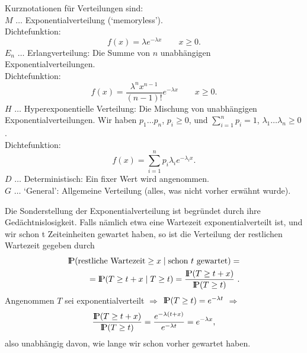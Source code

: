 Kurznotationen für Verteilungen sind: \\
$M$ $\dots$ Exponentialverteilung (`memoryless'). \\
Dichtefunktion:
\begin{displaymath}
f(x) = \lambda e^{-\lambda x} \qquad x\geq 0.
\end{displaymath}
$E_{n}$ $\dots$ Erlangverteilung: Die Summe von $n$ unabhängigen
Exponentialverteilungen.\\
 Dichtefunktion:
\begin{displaymath}
f(x)=\frac{\lambda^{n}x^{n-1}}{(n-1)!}e^{-\lambda x} \qquad x\geq 0.
\end{displaymath}
$H$ $\dots$ Hyperexponentielle Verteilung: Die Mischung von unabhängigen
Exponentialverteilungen. Wir haben $p_{1} \dots p_{n}$,  $p_{i} \geq 0$,
 und
$\sum_{i=1}^{n} p_{i} = 1$, $\lambda_{1} \dots \lambda_{n} \geq 0$. \\
Dichtefunktion:
\begin{displaymath}
f(x)=\sum_{i=1}^{n} p_{i} \lambda_{i} e^{-\lambda_{i}x}.
\end{displaymath}
$D$ $\dots$ Deterministisch: Ein fixer Wert wird angenommen. \\
$G$ $\dots$ `General': Allgemeine Verteilung (alles, was nicht vorher erwähnt
wurde).

Die Sonderstellung der Exponentialverteilung ist begründet durch ihre
Gedächtnislosigkeit. Falls nämlich etwa eine Wartezeit
exponentialverteilt ist, und wir schon t Zeiteinheiten gewartet haben, so
ist die Verteilung der restlichen Wartezeit gegeben durch
\begin{eqnarray*}
{\rm I\kern-0.2em P}(\mbox{restliche Wartezeit} \geq x \mid \mbox{schon $t$
gewartet}) = \\
= {\rm I\kern-0.2em P}(T \geq t+x \mid T \geq t) = \frac{{\rm I\kern-0.2em P}(T \geq t+x)}{{\rm I\kern-0.2em P}(T\geq t)} ~.
\end{eqnarray*}
Angenommen $T$  sei exponentialverteilt $\Rightarrow$ ${\rm I\kern-0.2em P}(T \geq t) =
e^{-\lambda t}$  $\Rightarrow$
\begin{displaymath}
\frac{{\rm I\kern-0.2em P}(T \geq t+x)}{{\rm I\kern-0.2em P}(T \geq t)} = \frac{e^{-\lambda
(t+x)}}{e^{-\lambda
t}}= e^{-\lambda x},
\end{displaymath}
also unabhängig davon, wie lange wir schon vorher gewartet haben.


